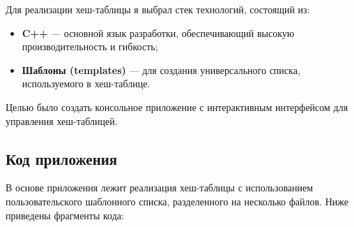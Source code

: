 \documentclass[12pt,a4paper]{scrartcl}
\begin{document}
Для реализации хеш-таблицы я выбрал стек технологий, состоящий из:
\begin{itemize}
    \item \textbf{C++} — основной язык разработки, обеспечивающий высокую производительность и гибкость;
    \item \textbf{Шаблоны (templates)} — для создания универсального списка, используемого в хеш-таблице.
\end{itemize}

Целью было создать консольное приложение с интерактивным интерфейсом для управления хеш-таблицей.

\subsection{Код приложения}

В основе приложения лежит реализация хеш-таблицы с использованием пользовательского шаблонного списка, разделенного на несколько файлов. Ниже приведены фрагменты кода:
\end{document}
